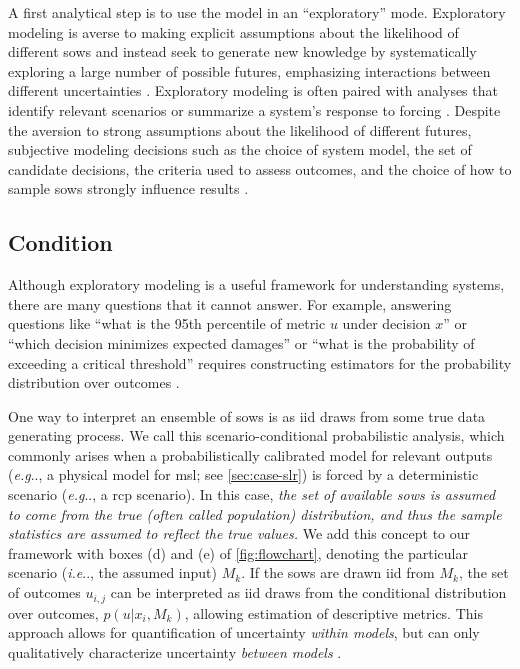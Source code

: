 \documentclass[11pt]{article}
\makeatletter
\DeclareRobustCommand\onedot{\futurelet\@let@token\@onedot}
\def\@onedot{\ifx\@let@token.\else.\null\fi\xspace}
\def\eg{\emph{e.g}\onedot} \def\Eg{\emph{E.g}\onedot}
\def\ie{\emph{i.e}\onedot} \def\Ie{\emph{I.e}\onedot}
\DeclareRobustCommand\onedot{\futurelet\@let@token\@onedot}
\def\@onedot{\ifx\@let@token.\else.\null\fi\xspace}
\def\eg{\emph{e.g}\onedot} \def\Eg{\emph{E.g}\onedot}
\def\ie{\emph{i.e}\onedot} \def\Ie{\emph{I.e}\onedot}
\makeatother
\begin{document}
A first analytical step is to use the model in an ``exploratory'' mode.
Exploratory modeling is averse to making explicit assumptions about the likelihood of different \glspl{sow} and instead seek to generate new knowledge \citep{bankes:1993} by systematically exploring a large number of possible futures, emphasizing interactions between different uncertainties \citep{reed_msdbook:2022}.
Exploratory modeling is often paired with analyses that identify relevant scenarios  \citep{lamontagne_discovery:2018,groves_scenarios:2007} or summarize a system's response to forcing \citep{Poff:2015jn,Steinschneider:2015kk,sriver_sealevel:2018}.
Despite the aversion to strong assumptions about the likelihood of different futures, subjective modeling decisions such as the choice of system model, the set of candidate decisions, the criteria used to assess outcomes, and the choice of how to sample \glspl{sow} strongly influence results \citep{quinn_exploratory:2020}.

\subsection{Condition}\label{sec:analysis-condition}

Although exploratory modeling is a useful framework for understanding systems, there are many questions that it cannot answer.
For example, answering questions like ``what is the 95th percentile of metric $u$ under decision $x$'' or ``which decision minimizes expected damages'' or ``what is the probability of exceeding a critical threshold'' requires constructing estimators for the probability distribution over outcomes \citep{schneider_scenarios:2002}.

One way to interpret an ensemble of \glspl{sow} is as \gls{iid} draws from some true data generating process.
We call this scenario-conditional probabilistic analysis, which commonly arises when a probabilistically calibrated model for relevant outputs (\eg, a physical model for \gls{msl}; see \cref{sec:case-slr}) is forced by a deterministic scenario (\eg, a \gls{rcp} scenario).
In this case, \emph{the set of available \glspl{sow} is assumed to come from the true (often called population) distribution, and thus the sample statistics are assumed to reflect the true values.}
We add this concept to our framework with boxes (d) and (e) of \cref{fig:flowchart}, denoting the particular scenario (\ie, the assumed input) $M_k$.
If the \glspl{sow} are drawn \gls{iid} from $M_k$, the set of outcomes $u_{i, j}$ can be interpreted as \gls{iid} draws from the conditional distribution over outcomes, $p(u | x_i, M_k)$, allowing estimation of descriptive metrics.
This approach allows for quantification of uncertainty \emph{within models}, but can only qualitatively characterize uncertainty \emph{between models} \citep{wong_nola:2017,ruckert_coastal:2019,sharma_rcp:2021}. %
\end{document}
